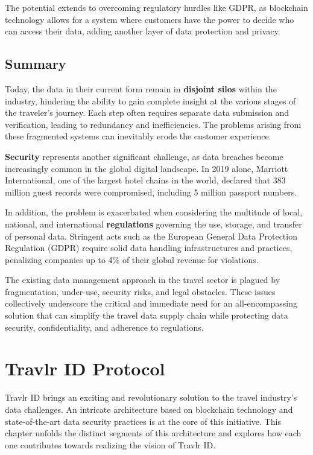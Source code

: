 \documentclass{article}
\begin{document}
The potential extends to overcoming regulatory hurdles like GDPR, as blockchain technology allows for a system where customers have the power to decide who can access their data, adding another layer of data protection and privacy.

\subsection{Summary}

Today, the data in their current form remain in \textbf{disjoint silos} within the industry, hindering the ability to gain complete insight at the various stages of the traveler’s journey. Each step often requires separate data submission and verification, leading to redundancy and inefficiencies. The problems arising from these fragmented systems can inevitably erode the customer experience.

\textbf{Security} represents another significant challenge, as data breaches become increasingly common in the global digital landscape. In 2019 alone, Marriott International, one of the largest hotel chains in the world, declared that 383 million guest records were compromised, including 5 million passport numbers.

In addition, the problem is exacerbated when considering the multitude of local, national, and international \textbf{regulations} governing the use, storage, and transfer of personal data. Stringent acts such as the European General Data Protection Regulation (GDPR) require solid data handling infrastructures and practices, penalizing companies up to 4\% of their global revenue for violations.

The existing data management approach in the travel sector is plagued by fragmentation, under-use, security risks, and legal obstacles. These issues collectively underscore the critical and immediate need for an all-encompassing solution that can simplify the travel data supply chain while protecting data security, confidentiality, and adherence to regulations.

\newpage

\section{Travlr ID Protocol}

Travlr ID brings an exciting and revolutionary solution to the travel industry's data challenges. An intricate architecture based on blockchain technology and state-of-the-art data security practices is at the core of this initiative. This chapter unfolds the distinct segments of this architecture and explores how each one contributes towards realizing the vision of Travlr ID.
\end{document}
